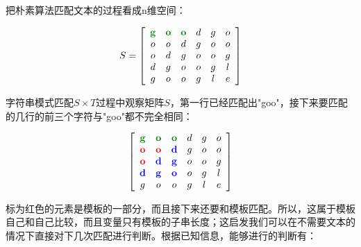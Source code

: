 \documentclass{article}
\begin{document}
	把朴素算法匹配文本的过程看成n维空间：

	$$
	S = 
	\left[\begin{array}{cccccc}
			\color{green!50!black}\mathbf{g} & \color{green!50!black}\mathbf{o} & \color{green!50!black}\mathbf{o} & d & g & o \\
			o&o&d&g&o&o \\ 
			o&d&g&o&o&g \\
			d&g&o&o&g&l \\
			g&o&o&g&l&e 
	\end{array}\right]
	$$
	
	字符串模式匹配$S \times T$过程中观察矩阵$S$，第一行已经匹配出"goo"，接下来要匹配的几行的前三个字符与"goo"都不完全相同：

	$$
	\left[\begin{array}{cccccc}
			\color{green!50!black}\mathbf{g} & \color{green!50!black}\mathbf{o} & \color{green!50!black}\mathbf{o} & d & g & o \\
			\color{red}\mathbf{o}&\color{red}\mathbf{o}&\color{blue}\mathbf{d}&g&o&o \\ 
			\color{red}\mathbf{o}&\color{blue}\mathbf{d}&\color{blue}\mathbf{g}&o&o&g \\
			\color{blue}\mathbf{d}&\color{blue}\mathbf{g}&\color{blue}\mathbf{o}&o&g&l \\
			g&o&o&g&l&e 
	\end{array}\right]
	$$

	标为红色的元素是模板的一部分，而且接下来还要和模板匹配。所以，这属于模板自己和自己比较，而且变量只有模板的子串长度；这启发我们可以在不需要文本的情况下直接对下几次匹配进行判断。根据已知信息，能够进行的判断有：

	\vspace{0.7cm}

\end{document}
